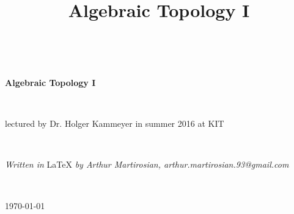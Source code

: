 \documentclass[11pt]{book}
\title{Algebraic Topology I}
\numberwithin{dummy}{section}
\theoremstyle{nonumberbreak}
\begin{document}
\begin{titlepage}


\textrm{ }\\[64pt]

\begin{center}
{\fontsize{32}{32} \selectfont \textbf{Algebraic Topology I}}
\end{center}
\textrm{ } \\[36pt]
\begin{center} \large{\textrm{lectured by Dr. Holger Kammeyer in summer 2016 at KIT}} \end{center}
\textrm{ } \\[320pt]
\begin{center} \large{\textit{Written in } \LaTeX \textit{ by Arthur Martirosian, arthur.martirosian.93@gmail.com}}\end{center}
\textrm{ }\\[24pt]
\begin{center} \large{\today} \end{center}

\end{titlepage}
\thispagestyle{empty}



\begin{spacing}{1.4}
\setcounter{tocdepth}{2}
\tableofcontents
\thispagestyle{empty}
\end{spacing}
\newpage

\newpage
\end{document}
